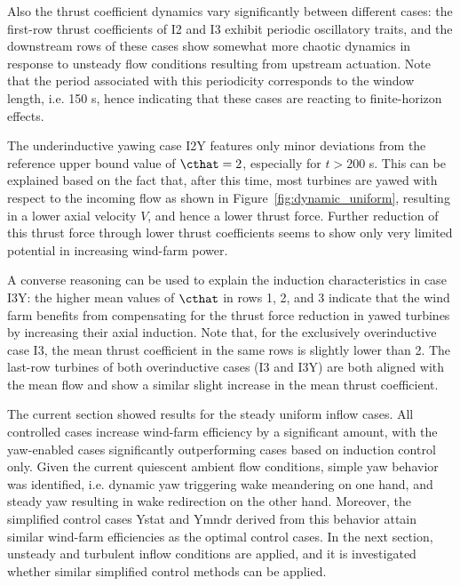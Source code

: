 	Also the thrust coefficient dynamics vary significantly between different cases: the first-row thrust coefficients of I2 and I3 exhibit periodic oscillatory traits, and the downstream rows of these cases show somewhat more chaotic dynamics in response to unsteady flow conditions resulting from upstream actuation. Note that the period associated with this periodicity corresponds to the window length, i.e. 150 s, hence indicating that these cases are reacting to finite-horizon effects. 
	
	The underinductive yawing case I2Y features only minor deviations from the reference upper bound value of $\cthat = 2$, especially for $t > 200$ s. This can be explained based on the fact that, after this time, most turbines are yawed with respect to the incoming flow as shown in Figure~\ref{fig:dynamic_uniform}, resulting in a lower axial velocity $V$, and hence a lower thrust force. Further reduction of this thrust force through lower thrust coefficients seems to show only very limited potential in increasing wind-farm power. 
	
	A converse reasoning can be used to explain the induction characteristics in case I3Y: the higher mean values of $\cthat$ in rows 1, 2, and 3 indicate that the wind farm benefits from compensating for the thrust force reduction in yawed turbines by increasing their axial induction. Note that, for the exclusively overinductive case I3, the mean thrust coefficient in the same rows is slightly lower than 2. The last-row turbines of both overinductive cases (I3 and I3Y) are both aligned with the mean flow and show a similar slight increase in the mean thrust coefficient. 
	
	The current section showed results for the steady uniform inflow cases. All controlled cases increase wind-farm efficiency by a significant amount, with the yaw-enabled cases significantly outperforming cases based on induction control only. Given the current quiescent ambient flow conditions, simple yaw behavior was identified, i.e. dynamic yaw triggering wake meandering on one hand, and steady yaw resulting in wake redirection on the other hand. Moreover, the simplified control cases Ystat and Ymndr derived from this behavior attain similar wind-farm efficiencies as the optimal control cases. In the next section, unsteady and turbulent inflow conditions are applied, and it is investigated whether similar simplified control methods can be applied.

